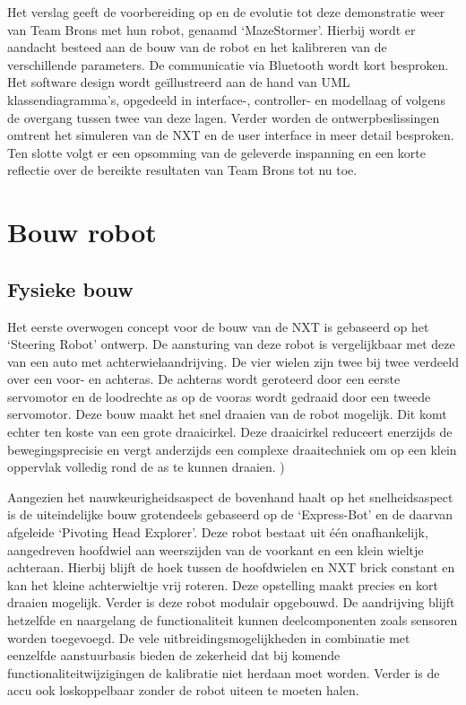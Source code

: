 \documentclass[tt1]{penoverslag}
\begin{document}
Het verslag geeft de voorbereiding op en de evolutie tot deze demonstratie weer van Team Brons met hun robot, genaamd ‘MazeStormer’. Hierbij wordt er aandacht besteed aan de bouw van de robot en het kalibreren van de verschillende parameters. De communicatie via Bluetooth wordt kort besproken. Het software design wordt geïllustreerd aan de hand van UML klassendiagramma’s, opgedeeld in interface-, controller- en modellaag of volgens de overgang tussen twee van deze lagen. Verder worden de ontwerpbeslissingen omtrent het simuleren van de NXT en de user interface in meer detail besproken. Ten slotte volgt er een opsomming van de geleverde inspanning en een korte reflectie over de bereikte resultaten van Team Brons tot nu toe.



\section{Bouw robot}

\subsection{Fysieke bouw}
Het eerste overwogen concept voor de bouw van de NXT is gebaseerd op het ‘Steering Robot’ ontwerp. De aansturing van deze robot is vergelijkbaar met deze van een auto met achterwielaandrijving. De vier wielen zijn twee bij twee verdeeld over een voor- en achteras. De achteras wordt geroteerd door een eerste servomotor en de loodrechte as op de vooras wordt gedraaid door een tweede servomotor. Deze bouw maakt het snel draaien van de robot mogelijk. Dit komt echter ten koste van een grote draaicirkel. Deze draaicirkel reduceert enerzijds de bewegingsprecisie en vergt anderzijds een complexe draaitechniek om op een klein oppervlak volledig rond de as te kunnen draaien. \cite{steeringrover})

Aangezien het nauwkeurigheidsaspect de bovenhand haalt op het snelheidsaspect is de uiteindelijke bouw grotendeels gebaseerd op de ‘Express-Bot’ en de daarvan afgeleide ‘Pivoting Head Explorer’. Deze robot bestaat uit één onafhankelijk, aangedreven hoofdwiel aan weerszijden van de voorkant en een klein wieltje achteraan. Hierbij blijft de hoek tussen de hoofdwielen en NXT brick constant en kan het kleine achterwieltje vrij roteren. Deze opstelling maakt precies en kort draaien mogelijk. Verder is deze robot modulair opgebouwd. De aandrijving blijft hetzelfde en naargelang de functionaliteit kunnen deelcomponenten zoals sensoren worden toegevoegd. De vele uitbreidingsmogelijkheden in combinatie met eenzelfde aanstuurbasis bieden de zekerheid dat bij komende functionaliteitwijzigingen de kalibratie niet herdaan moet worden. Verder is de accu ook loskoppelbaar zonder de robot uiteen te moeten halen. \cite{expressbot}
\end{document}
